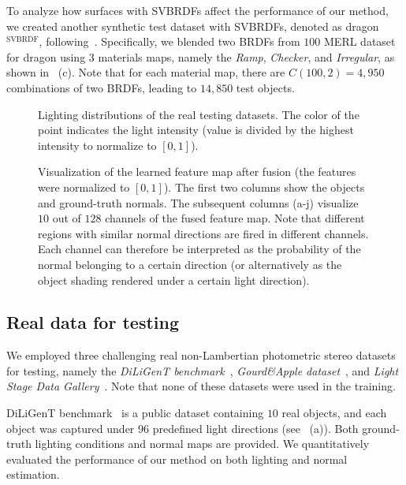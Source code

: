 \documentclass[10pt,journal,compsoc]{IEEEtran}
\begin{document}
To analyze how surfaces with SVBRDFs affect the performance of our method, we created another synthetic test dataset with SVBRDFs, denoted as {\sc dragon}$^{\text{SVBRDF}}$, following~\cite{goldman2010shape}.
Specifically, we blended two BRDFs from $100$ MERL dataset for {\sc dragon} using $3$ materials maps, namely the \emph{Ramp}, \emph{Checker}, and \emph{Irregular}, as shown in ~(c). Note that for each material map, there are $C(100,2)=4,950$ combinations of two BRDFs, leading to $14,850$ test objects.

\begin{figure}[t] \centering
    
    \caption{Lighting distributions of the real testing datasets. The color of the point indicates the light intensity (value is divided by the highest intensity to normalize to $[0,1]$).} \label{fig:light_dist}
\end{figure}

\begin{figure}[t]%
    \centering
    
    \caption{Visualization of the learned feature map after fusion (the features were normalized to $[0, 1]$). The first two columns show the objects and ground-truth normals. The subsequent columns (a-j) visualize $10$ out of $128$ channels of the fused feature map. Note that different regions with similar normal directions are fired in different channels. Each channel can therefore be interpreted as the probability of the normal belonging to a certain direction (or alternatively as the object shading rendered under a certain light direction). } \label{fig:res_visual}
\end{figure}

\subsection{Real data for testing}
We employed three challenging real non-Lambertian photometric stereo datasets for testing, namely the \emph{DiLiGenT benchmark}~\cite{shi2018benchmark}, \emph{Gourd\&Apple dataset}~\cite{alldrin2008p}, and \emph{Light Stage Data Gallery}~\cite{einarsson2006relighting}. Note that none of these datasets were used in the training.

DiLiGenT benchmark~\cite{shi2018benchmark} is a public dataset containing $10$ real objects, and each object was captured under $96$ predefined light directions (see ~(a)).  Both ground-truth lighting conditions and normal maps are provided. 
We quantitatively evaluated the performance of our method on both lighting and normal estimation.
\end{document}
